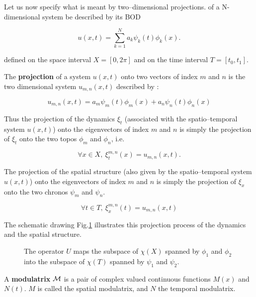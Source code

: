 \medskip


Let us now specify what is meant by two--dimensional projections.
of a N-dimensional system be described by its BOD

\begin{equation}
u(x,t)=\sum_{k=1}^N a_k \psi_k(t)\phi_k(x).
\end{equation}

defined on the space interval 
$X=[0,2\pi]$ and on the time interval $T=[t_0,t_1]$.

\begin{defn}
The {\bf projection} of a system $u(x,t)$ onto two vectors of index 
$m$ and $n$ is the two dimensional system $u_{m,n}(x,t)$ described by :

\begin{equation}
u_{m,n}(x,t)=a_m \psi_m(t)\phi_m(x)+a_n \psi_n(t)\phi_n(x)
\end{equation}

\end{defn}

Thus the projection of the dynamics $\xi_t$
 (associated with the spatio--temporal system $u(x,t)$)
onto the eigenvectors of index $m$ and $n$ is simply 
the projection of $\xi_t$ onto the two topos $\phi_m$ and $\phi_n$, i.e.

\begin{equation}
\forall x \in X,\  \xi_t^{m,n}(x)=u_{m,n}(x,t).
\end{equation}

The projection of the spatial structure (also given by the 
spatio--temporal system $u(x,t)$) onto the eigenvectors of 
index $m$ and $n$ is simply the projection of $\xi_x$ 
onto the two chronos $\psi_m$ and $\psi_n$.


\begin{equation}
\forall t \in T,\   \xi_x^{m,n}(t)=u_{m,n}(x,t)
\end{equation}

The schematic drawing Fig.\ref{bodsk} illustrates this projection
process of the dynamics and the spatial structure.

\begin{figure}
\centering
{}
\caption{The operator $U$ maps  the subspace of $\chi(X)$ spanned by
 $\phi_1$ and $\phi_2$ into the subspace of $\chi(T)$ spanned by 
$\psi_1$ and $\psi_2$.}
\label{bodsk}
\end{figure}

\begin{defn}
A {\bf modulatrix} ${\cal M}$ is a pair of complex valued continuous 
functions $M(x)$ and $N(t)$. $M$ is called the spatial modulatrix,
 and $N$ the temporal modulatrix.
\end{defn}


